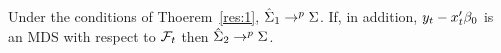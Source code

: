 Under the conditions of Thoerem~\ref{res:1}, $\hat\Sigma_1 \to^p
\Sigma$. If, in addition, $y_t - x_t'\btrue$ is an MDS with respect to
$\mathcal{F}_t$ then $\hat\Sigma_2 \to^p \Sigma$.
